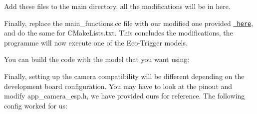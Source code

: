 \begin{adjustwidth}{1em}{0em}
Add these files to the {\ttfamily main} directory, all the modifications will be in here.

Finally, replace the {\ttfamily main\+\_\+functions.\+cc} file with our modified one provided \href{./esp32s3}{\texttt{ here}}, and do the same for {\ttfamily CMake\+Lists.\+txt}. This concludes the modifications, the programme will now execute one of the Eco-\/\+Trigger models.

You can build the code with the model that you want using\+: 
\begin{DoxyCode}{0}

\end{DoxyCode}
 Finally, setting up the camera compatibility will be different depending on the development board configuration. You may have to look at the pinout and modify {\ttfamily app\+\_\+camera\+\_\+esp.\+h}, we have provided ours for reference. The following config worked for us\+: 
\begin{DoxyCode}{0}
\DoxyCodeLine{}
\DoxyCodeLine{}
\DoxyCodeLine{}

\end{DoxyCode}
 \end{adjustwidth}
